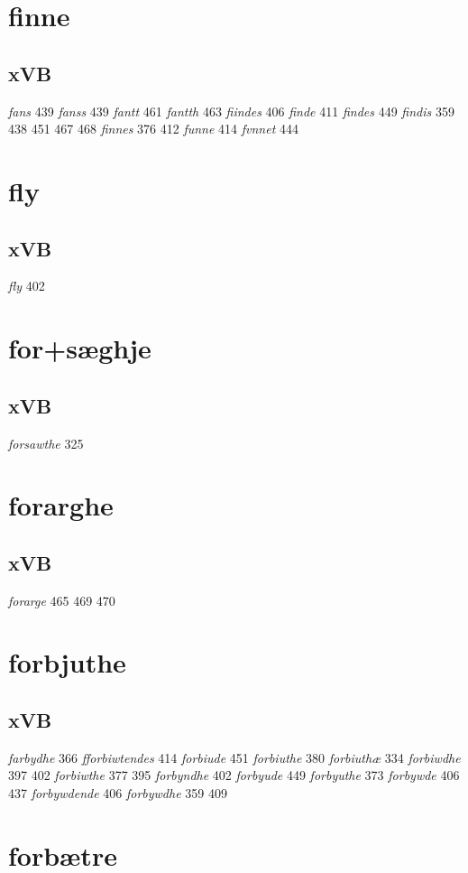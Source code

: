 \documentclass[a4paper,twocolumn]{article}
\begin{document}
\section{finne}
\label{sec:org427a610}
\subsection{xVB}
\label{sec:org4caa533}
\emph{fans} 439 \emph{fanss} 439 \emph{fantt} 461 \emph{fantth} 463 \emph{fiindes} 406 \emph{finde} 411 \emph{findes} 449 \emph{findis} 359 438 451 467 468 \emph{finnes} 376 412 \emph{funne} 414 \emph{fvnnet} 444 
\section{fly}
\label{sec:org86ffc1f}
\subsection{xVB}
\label{sec:org9db8ee3}
\emph{fly} 402 
\section{for+sæghje}
\label{sec:org3eb3d73}
\subsection{xVB}
\label{sec:org3a98e0b}
\emph{forsawthe} 325 
\section{forarghe}
\label{sec:org5611f55}
\subsection{xVB}
\label{sec:orge31362a}
\emph{forarge} 465 469 470 
\section{forbjuthe}
\label{sec:org74e3bde}
\subsection{xVB}
\label{sec:org52021a9}
\emph{farbydhe} 366 \emph{fforbiwtendes} 414 \emph{forbiude} 451 \emph{forbiuthe} 380 \emph{forbiuthæ} 334 \emph{forbiwdhe} 397 402 \emph{forbiwthe} 377 395 \emph{forbyndhe} 402 \emph{forbyude} 449 \emph{forbyuthe} 373 \emph{forbywde} 406 437 \emph{forbywdende} 406 \emph{forbywdhe} 359 409 
\section{forbætre}
\label{sec:org5228e9e}
\end{document}
